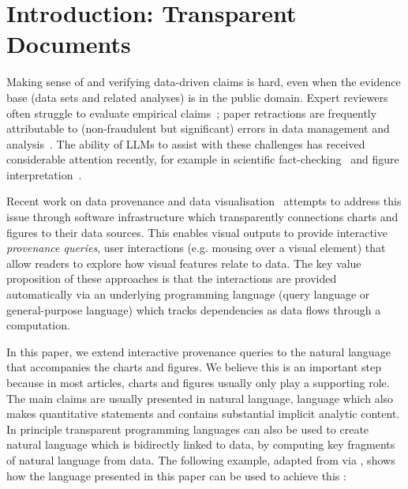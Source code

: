 \section{Introduction: Transparent Documents}

Making sense of and verifying data-driven claims is hard, even when the evidence base (data sets and related
analyses) is in the public domain. Expert reviewers often struggle to evaluate empirical
claims~\citep{weber20}; paper retractions are frequently attributable to (non-fraudulent but significant)
errors in data management and analysis~\citep{hu25}. The ability of LLMs to assist with these challenges has
received considerable attention recently, for example in scientific fact-checking~\citep{abu-ahmad25} and
figure interpretation~\citep{roberts24}.

Recent work on data provenance and data visualisation~\citep{psallidas18smoke,perera22,bond25} attempts to
address this issue through software infrastructure which transparently connections charts and figures to their
data sources.  This enables visual outputs
to provide interactive \emph{provenance queries}, user interactions (e.g. mousing over a visual element) that
allow readers to explore how visual features relate to data. The key value proposition of these approaches is
that the interactions are provided automatically via an underlying programming language (query language or
general-purpose language) which tracks dependencies as data flows through a computation.

In this paper, we extend interactive provenance queries to the natural language that accompanies the charts
and figures. We believe this is an important step because in most articles, charts and figures usually only
play a supporting role. The main claims are usually presented in natural language, language which also makes
quantitative statements and contains substantial implicit analytic content. In principle transparent
programming languages can also be used to create natural language which is bidirectly linked to data, by
computing key fragments of natural language from data. The following example, adapted from \cite{zhang18} via
\cite{moosavi21}, shows how the language presented in this paper can be used to achieve this :

